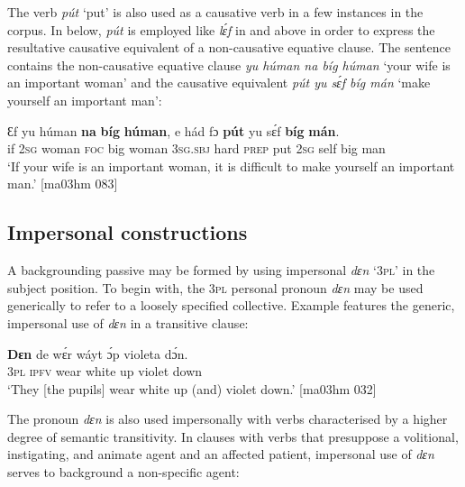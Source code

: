 The verb \textit{pút} ‘put’ is also used as a causative verb in a few instances in the corpus. In  below, \textit{pút} is employed like \textit{lɛ́f} in  and  above in order to express the resultative causative equivalent of a non-causative equative clause{\fff}. The sentence contains the non-causative equative clause \textit{yu húman na bíg húman} ‘your wife is an important woman’ and the causative equivalent \textit{pút yu sɛ́f bíg mán} ‘make yourself an important man’:{\fff}



\ea%
    \label{ex:key:1340}
    \gll Ɛf  yu  húman  \textbf{na}  \textbf{bíg}  \textbf{húman},  e    hád    fɔ
\textbf{pút}     yu  sɛ́f  \textbf{bíg}  \textbf{mán}.\\
if  \textsc{2sg}  woman  \textsc{foc}  big  woman  \textsc{3sg.sbj}  hard  \textsc{prep}
put    \textsc{2sg}  self  big  man\\

\glt ‘If your wife is an important woman, it is difficult to make yourself 
an important man.’ [ma03hm 083]
\z

\subsection{Impersonal constructions}\label{sec:9.4.5}

A backgrounding passive may be formed by using impersonal \textit{dɛn} ‘\textsc{3pl’} in the subject position. To begin with, the \textsc{3pl} personal pronoun \textit{dɛn} may be used generically to refer to a loosely specified collective. Example  features the generic, impersonal use of \textit{dɛn} in a transitive clause: 


\ea%
    \label{ex:key:1341}
    \gll \textbf{Dɛn}  de  wɛ́r    wáyt  ɔ́p  violeta  dɔ́n.\\
\textsc{3pl}  \textsc{ipfv}  wear  white  up  violet  down\\

\glt ‘They [the pupils] wear white up (and) violet down.’ [ma03hm 032]
\z

The pronoun \textit{dɛn} is also used impersonally with verbs characterised by a higher degree of semantic transitivity. In clauses with verbs that presuppose a volitional, instigating, and animate agent and an affected patient, impersonal use of \textit{dɛn} serves to background a non-specific agent:



